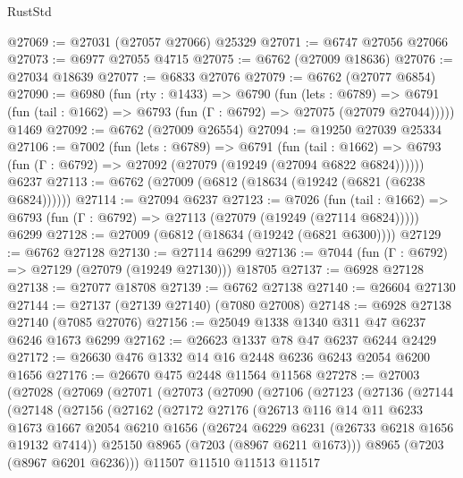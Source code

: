 \begin{lexlean}{RustStd}
\begin{coremodule}
@27069 := @27031 (@27057 @27066) @25329
@27071 := @6747 @27056 @27066
@27073 := @6977 @27055 @4715
@27075 := @6762 (@27009 @18636)
@27076 := @27034 @18639
@27077 := @6833 @27076
@27079 := @6762 (@27077 @6854)
@27090 := @6980
    (fun (rty : @1433) =>
    @6790
      (fun (lets : @6789) =>
      @6791 (fun (tail : @1662) => @6793 (fun (Γ : @6792) => @27075 (@27079 @27044)))))
    @1469
@27092 := @6762 (@27009 @26554)
@27094 := @19250 @27039 @25334
@27106 := @7002
    (fun (lets : @6789) =>
    @6791
      (fun (tail : @1662) =>
      @6793 (fun (Γ : @6792) => @27092 (@27079 (@19249 (@27094 @6822 @6824))))))
    @6237
@27113 := @6762 (@27009 (@6812 (@18634 (@19242 (@6821 (@6238 @6824))))))
@27114 := @27094 @6237
@27123 := @7026
    (fun (tail : @1662) => @6793 (fun (Γ : @6792) => @27113 (@27079 (@19249 (@27114 @6824)))))
    @6299
@27128 := @27009 (@6812 (@18634 (@19242 (@6821 @6300))))
@27129 := @6762 @27128
@27130 := @27114 @6299
@27136 := @7044 (fun (Γ : @6792) => @27129 (@27079 (@19249 @27130))) @18705
@27137 := @6928 @27128
@27138 := @27077 @18708
@27139 := @6762 @27138
@27140 := @26604 @27130
@27144 := @27137 (@27139 @27140) (@7080 @27008)
@27148 := @6928 @27138 @27140 (@7085 @27076)
@27156 := @25049 @1338 @1340 @311 @47 @6237 @6246 @1673 @6299
@27162 := @26623 @1337 @78 @47 @6237 @6244 @2429
@27172 := @26630 @476 @1332 @14 @16 @2448 @6236 @6243 @2054 @6200 @1656
@27176 := @26670 @475 @2448 @11564 @11568
@27278 := @27003
    (@27028
      (@27069
        (@27071
          (@27073
            (@27090
              (@27106
                (@27123
                  (@27136
                    (@27144
                      (@27148
                        (@27156
                          (@27162
                            (@27172
                              @27176
                              (@26713
                                @116
                                @14
                                @11
                                @6233
                                @1673
                                @1667
                                @2054
                                @6210
                                @1656
                                (@26724 @6229 @6231 (@26733 @6218 @1656 @19132 @7414))
                                @25150
                                @8965
                                (@7203 (@8967 @6211 @1673)))
                              @8965
                              (@7203 (@8967 @6201 @6236)))
                            @11507
                            @11510
                            @11513
                            @11517

\end{coremodule}
\end{lexlean}
